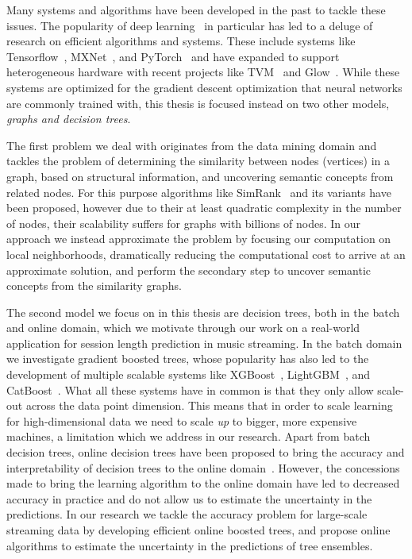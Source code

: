 Many systems and algorithms have been developed in the past to
tackle these issues. The popularity of deep learning~\cite{deep-learning}
in particular has led to a deluge of research on efficient
algorithms and systems. These include systems like Tensorflow~\cite{tensorflow},
MXNet~\cite{mxnet},
and PyTorch~\cite{pytorch} and have expanded to support heterogeneous hardware with recent projects
like TVM~\cite{tvm} and Glow~\cite{glow}. While these systems are optimized for the gradient
descent optimization that neural networks are commonly trained with,
this thesis is focused instead on two other models, \emph{graphs and decision
trees}.

The first problem we deal with originates
from the data mining domain and tackles the problem of determining the
similarity between nodes (vertices) in a graph, based on structural information,
and uncovering semantic concepts from related nodes.
For this purpose algorithms like SimRank~\cite{simrank} and its variants have been
proposed, however due to their at least quadratic complexity in the number of nodes, their scalability
 suffers for graphs with billions of nodes.
In our approach we instead approximate the problem by focusing
our computation on local neighborhoods, dramatically reducing the
computational cost to arrive at an approximate solution, and perform
the secondary step to uncover semantic concepts from the similarity graphs.

The second model we focus on in this thesis are decision trees,
both in the batch and online domain, which we motivate through our
work on a real-world application for session length prediction in music streaming.
In the batch domain we investigate
gradient boosted trees, whose popularity has also led
to the development of multiple scalable systems like XGBoost~\cite{xgboost},
LightGBM~\cite{lightgbm}, and CatBoost~\cite{catboost}. What all these
systems have in common is that they only allow scale-out across
the data point dimension.  This means that in order to scale learning
for high-dimensional data we need to scale \emph{up} to bigger, more expensive
machines, a limitation which we address in our research. Apart from
batch decision trees, online decision trees have been proposed
to bring the accuracy and interpretability of decision trees to
the online domain~\cite{vfdt}. However, the concessions made to
bring the learning algorithm to the online domain have led to
decreased accuracy in practice and do not allow us to estimate the uncertainty
in the predictions. In our research we tackle the accuracy problem for
large-scale streaming data by developing efficient online boosted trees,
and propose online algorithms to estimate the uncertainty in the
predictions of tree ensembles.

